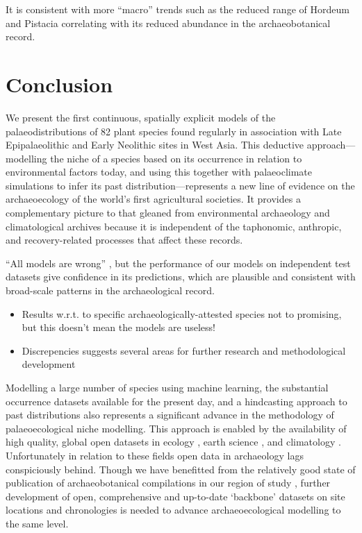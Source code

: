 \documentclass[
  authoryear,
  preprint]{elsarticle}
\providecommand{\tightlist}{%
  \setlength{\itemsep}{0pt}\setlength{\parskip}{0pt}}\usepackage{longtable,booktabs,array}
\begin{document}
It is consistent with more ``macro'' trends such as the reduced range of
Hordeum and Pistacia correlating with its reduced abundance in the
archaeobotanical record.

\section{Conclusion}\label{conclusion}

We present the first continuous, spatially explicit models of the
palaeodistributions of 82 plant species found regularly in association
with Late Epipalaeolithic and Early Neolithic sites in West Asia. This
deductive approach---modelling the niche of a species based on its
occurrence in relation to environmental factors today, and using this
together with palaeoclimate simulations to infer its past
distribution---represents a new line of evidence on the archaeoecology
of the world's first agricultural societies. It provides a complementary
picture to that gleaned from environmental archaeology and
climatological archives because it is independent of the taphonomic,
anthropic, and recovery-related processes that affect these records.

``All models are wrong'' \citep{cite}, but the performance of our models
on independent test datasets give confidence in its predictions, which
are plausible and consistent with broad-scale patterns in the
archaeological record.

\begin{itemize}
\tightlist
\item
  Results w.r.t. to specific archaeologically-attested species not to
  promising, but this doesn't mean the models are useless!
\item
  Discrepencies suggests several areas for further research and
  methodological development
\end{itemize}

Modelling a large number of species using machine learning, the
substantial occurrence datasets available for the present day, and a
hindcasting approach to past distributions also represents a significant
advance in the methodology of palaeoecological niche modelling. This
approach is enabled by the availability of high quality, global open
datasets in ecology \citep{GBIF2025, GBIFSecretariat2023}, earth science
\citep{SRTM}, and climatology
\citep[@][]{KargerEtAl2017, BrownEtAl2018}. Unfortunately in relation to
these fields open data in archaeology lags conspiciously behind. Though
we have benefitted from the relatively good state of publication of
archaeobotanical compilations in our region of study
\citep{ADEMNES, COMPAG, ORIGINS}, further development of open,
comprehensive and up-to-date `backbone' datasets on site locations and
chronologies is needed to advance archaeoecological modelling to the
same level.


\renewcommand\refname{References}
  
\end{document}
